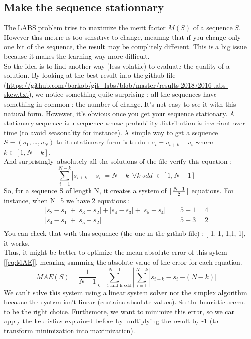 \documentclass[a4paper,11pt,openany]{article}
\DeclarePairedDelimiter{\ceil}{\lceil}{\rceil}
\begin{document}
\subsection{Make the sequence stationnary}
\noindent
The LABS problem tries to maximize the merit factor $M(S)$ of a sequence $S$. However this metric is too sensitive to change, meaning that if you change only one bit of the sequence, the result may be complitely different. This is a big issue because it makes the learning way more difficult.\\
So the idea is to find another way (less volatile) to evaluate the quality of a solution. By looking at the best result into the github file (\url{https://github.com/borkob/git_labs/blob/master/results-2018/2016-labs-skew.txt}), we notice something quite surprising : all the sequences have something in common : the number of change. It's not easy to see it with this natural form. Howewer, it's obvious once you get your sequence stationary. A stationary sequence is a sequence whose probability distribution is invariant over time (to avoid seasonality for instance). A simple way to get a sequence $S=(s_1,...,s_N)$ to its stationary form is to do : $s_i=s_{i+k}-s_i$ where $k\in [1,N-k]$.\\
And surprisingly, absolutely all the solutions of the file verify this equation :
\begin{equation}
\sum_{i=1}^{N-k} |s_{i+k}-s_{i}|=N-k \;\, \forall k \; odd\; \in [1,N-1]
\end{equation}
So, for a sequence S of length N, it creates a system of $\ceil{\frac{N-1}{2}}$ equations. For instance, when N=5 we have 2 equations :
\begin{equation}
\begin{split}
|s_2-s_1|+|s_3-s_2|+|s_4-s_3|+|s_5-s_4|&=5-1=4\\
|s_4-s_1|+|s_5-s_2|&=5-3=2\\
\end{split}
\end{equation}
You can check that with this sequence (the one in the github file) : [-1,-1,-1,1,-1], it works.\\
Thus, it might be better to optimize the mean absolute error of this sytem [\ref{eq:MAE}], meaning summing the absolute value of the error for each equation.
\begin{equation}
\label{eq:MAE}
MAE(S)=\frac{1}{N-1}\sum_{k=1 \text{ and k odd}}^{N-1}|\sum_{i=1}^{N-k} |s_{i+k}-s_{i}|-(N-k)|
\end{equation}
We can't solve this system using a linear system solver nor the simplex algorithm because the system isn't linear (contains absolute values). So the heuristic seems to be the right choice.
Furthemore, we want to minimize this error, so we can apply the heuristics explained before by multiplying the result by -1 (to transform minimization into maximization).\\
\end{document}
